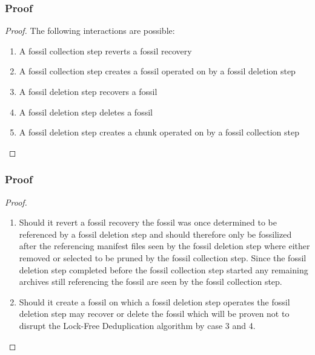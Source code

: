 \documentclass[english,utf8,aspectratio=169]{beamer}
\begin{document}
    \begin{frame}
        \frametitle{Proof}
        \begin{proof}
            The following interactions are possible:
            \begin{enumerate}
                \item A fossil collection step reverts a fossil recovery
                \item A fossil collection step creates a fossil operated on by a fossil deletion step
                \item A fossil deletion step recovers a fossil
                \item A fossil deletion step deletes a fossil
                \item A fossil deletion step creates a chunk operated on by a fossil collection step
            \end{enumerate}
        \end{proof}
    \end{frame}

    \begin{frame}
        \frametitle{Proof}
        \begin{proof}
            \begin{enumerate}
                \item Should it revert a fossil recovery the fossil was once determined to be referenced
                    by a fossil deletion step and should therefore only be fossilized after the
                    referencing manifest files seen by the fossil deletion step where either removed
                    or selected to be pruned by the fossil collection step.
                    Since the fossil deletion step completed before the fossil collection step started
                    any remaining archives still referencing the fossil are seen by the fossil collection step.
                \item Should it create a fossil on which a fossil deletion step operates the fossil deletion
                    step may recover or delete the fossil which will be proven not to disrupt the Lock-Free
                    Deduplication algorithm by case 3 and 4.
            \end{enumerate}
        \end{proof}
    \end{frame}
\end{document}
